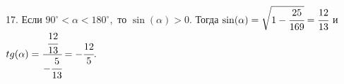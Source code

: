 17. Если  $90^\circ<\alpha<180^\circ,$ то $\sin(\alpha)>0.$ Тогда $\sin(\alpha)=\sqrt{1-\cfrac{25}{169}}=\cfrac{12}{13}$ и $tg(\alpha)=\cfrac{\cfrac{12}{13}}{-\cfrac{5}{13}}=-\cfrac{12}{5}.$\\
